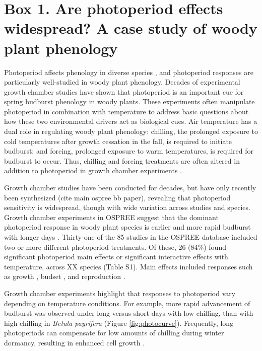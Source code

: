 \documentclass{article}
\begin{document}
\section*{Box 1. Are photoperiod effects widespread? A case study of woody plant phenology}
Photoperiod affects phenology in diverse species \citep[e.g., geese, salmon][]{muir1994,lameris2018}, and photoperiod responses are particularly well-studied in woody plant phenology. Decades of experimental growth chamber studies have shown that photoperiod is an important cue for spring budburst phenology in woody plants. These experiments often manipulate photoperiod in combination with temperature to address basic questions about how these two environmental drivers act as biological cues. Air temperature has a dual role in regulating woody plant phenology: chilling, the prolonged exposure to cold temperatures after growth cessation in the fall, is required to initiate budburst; and forcing, prolonged exposure to warm temperatures, is required for budburst to occur. Thus, chilling and forcing treatments are often altered in addition to photoperiod in growth chamber experiments \citep[e.g.,][]{Campbell:1975aa,HEIDE:1977aa,Falusi:1990aa,Spann:2004aa,Laube:2014a}. 
\par Growth chamber studies have been conducted for decades, but have only recently been synthesized (cite main ospree bb paper), revealing that photoperiod sensitivity is widespread, though with wide variation across studies and species. Growth chamber experiments in OSPREE suggest that the dominant photoperiod response in woody plant species is earlier and more rapid budburst with longer days \citep [e.g., ][]{Caffarra:2011a}. Thirty-one of the 85 studies in the OSPREE database included two or more different photoperiod treatments. Of these, 26 (84\%) found significant photoperiod main effects or significant interactive effects with temperature, across XX species (Table S1). Main effects included responses such as growth \citep[e.g., higher growth rates with longer days ][]{Ashby:1962aa}, budset \citep[e.g., more rapid induction of budset with shorter days][]{Howe:1995aa}, and reproduction \citep[e.g., increased flowering with longer days ][]{Heide:2012aa}. 
\par Growth chamber experiments highlight that responses to photoperiod vary depending on temperature conditions. For example, more rapid advancement of budburst was observed under long versus short days with low chilling, than with high chilling in \emph{Betula payrifera} \citep{Hawkins:2012} (Figure \ref{fig:photocurve}). Frequently, long photoperiods can compensate for low amounts of chilling during winter dormancy, resulting in enhanced cell growth \citep{Heide:1993,Myking:1995,Caffarra:2011b}.%
\end{document}
